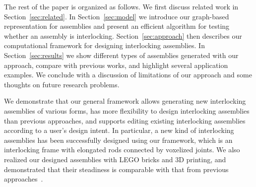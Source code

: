 









The rest of the paper is organized as follows. We first discuss related work in Section~\ref{sec:related}.
In Section~\ref{sec:model} we introduce our graph-based representation for assemblies and present an efficient algorithm for testing whether an assembly is interlocking. Section~\ref{sec:approach} then describes our computational framework for designing interlocking assemblies.
In Section~\ref{sec:results} we show different types of assemblies generated with our approach, compare with previous works, and highlight several application examples.  We conclude with a discussion of limitations of our approach and some thoughts on future research problems.


We demonstrate that our general framework allows generating new interlocking assemblies of various forms, has more flexibility to design interlocking assemblies than previous approaches, and supports editing existing interlocking assemblies according to a user's design intent. 
In particular, a new kind of interlocking assemblies has been successfully designed using our framework, which is an interlocking frame with elongated rods connected by voxelized joints. 
We also realized our designed assemblies with LEGO bricks and 3D printing, and demonstrated that their steadiness is comparable with that from previous approaches~\cite{Song-2012-InterCubes, Fu-2015-Furniture}.
\fi

